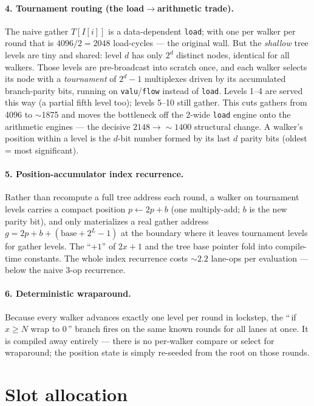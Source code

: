 \documentclass[11pt]{article}
\newcommand{\code}[1]{\texttt{#1}}
\begin{document}
\paragraph{4. Tournament routing (the load$\to$arithmetic trade).} The naive
gather $T[I[i]]$ is a data-dependent \code{load}; with one per walker per
round that is $4096/2 = 2048$ load-cycles --- the original wall. But the
\emph{shallow} tree levels are tiny and shared: level $d$ has only $2^d$
distinct nodes, identical for all walkers. Those levels are pre-broadcast
into scratch once, and each walker selects its node with a \emph{tournament}
of $2^d\!-\!1$ multiplexes driven by its accumulated branch-parity bits,
running on \code{valu}/\code{flow} instead of \code{load}. Levels 1--4 are
served this way (a partial fifth level too); levels 5--10 still gather. This
cuts gathers from 4096 to $\sim$1875 and moves the bottleneck off the 2-wide
\code{load} engine onto the arithmetic engines --- the decisive
$2148\!\to\!{\sim}1400$ structural change. A walker's position within a level
is the $d$-bit number formed by its last $d$ parity bits (oldest = most
significant).

\paragraph{5. Position-accumulator index recurrence.} Rather than recompute a
full tree address each round, a walker on tournament levels carries a compact
position $p \leftarrow 2p + b$ (one multiply-add; $b$ is the new parity bit),
and only materializes a real gather address $g = 2p + b + (\text{base} +
2^{L}-1)$ at the boundary where it leaves tournament levels for gather levels.
The ``$+1$'' of $2x{+}1$ and the tree base pointer fold into compile-time
constants. The whole index recurrence costs ${\sim}2.2$ lane-ops per
evaluation --- below the naive 3-op recurrence.

\paragraph{6. Deterministic wraparound.} Because every walker advances exactly
one level per round in lockstep, the ``\,if $x\ge N$ wrap to $0$\,'' branch
fires on the same known rounds for all lanes at once. It is compiled away
entirely --- there is no per-walker compare or select for wraparound; the
position state is simply re-seeded from the root on those rounds.

\section{Slot allocation}
\end{document}
